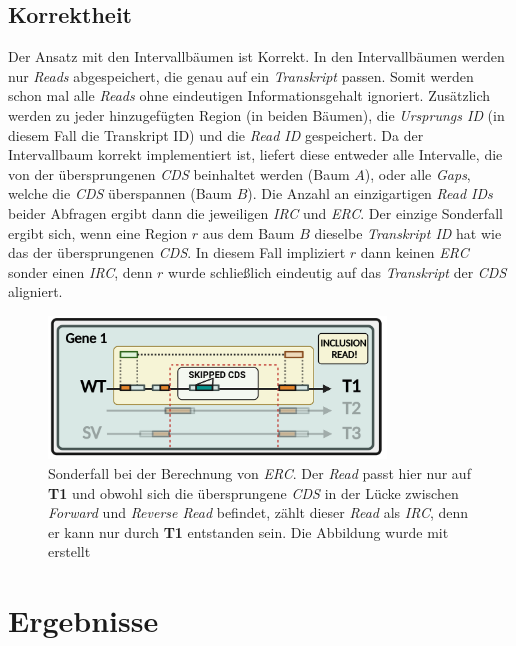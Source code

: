 \documentclass[12pt]{article}
\begin{document}
\subsection{Korrektheit}\label{sec:Korrektheit}
Der Ansatz mit den Intervallbäumen ist Korrekt. In den Intervallbäumen werden nur \textit{Reads} abgespeichert, die genau auf
ein \textit{Transkript} passen. Somit werden schon mal alle \textit{Reads} ohne eindeutigen Informationsgehalt 
ignoriert. Zusätzlich werden zu jeder hinzugefügten Region (in beiden Bäumen), die \textit{Ursprungs ID}
(in diesem Fall die Transkript ID) und die \textit{Read ID} gespeichert. 
Da der Intervallbaum korrekt implementiert ist, liefert diese entweder alle 
Intervalle, die von der übersprungenen \textit{CDS} beinhaltet werden (Baum $A$),
oder alle \textit{Gaps}, welche die \textit{CDS} überspannen (Baum $B$).
Die Anzahl an einzigartigen \textit{Read IDs} beider Abfragen ergibt dann die 
jeweiligen \textit{IRC} und \textit{ERC}.
Der einzige Sonderfall ergibt sich, wenn eine Region $r$ aus dem Baum $B$ dieselbe
\textit{Transkript ID} hat wie das der übersprungenen \textit{CDS}. 
In diesem Fall impliziert $r$ dann keinen \textit{ERC} sonder einen \textit{IRC}, 
denn $r$ wurde schlie\ss lich eindeutig auf das \textit{Transkript} der \textit{CDS}
aligniert.
\begin{figure}[htpb]
    \centering
    \includegraphics[width=0.8\textwidth]{./figures/EdgeCase.png}
    \caption{Sonderfall bei der Berechnung von \textit{ERC}. Der \textit{Read} passt hier nur auf \textbf{T1} und obwohl sich die übersprungene \textit{CDS} in der Lücke zwischen
    \textit{Forward} und \textit{Reverse Read} befindet, zählt dieser \textit{Read} als \textit{IRC}, denn er kann nur durch \textbf{T1} entstanden sein.
Die Abbildung wurde mit \cite{biorender} erstellt}
    \label{fig:-figures-EdgeCase-png}
\end{figure}
\newpage
\section{Ergebnisse}\label{sec:Ergebnisse}
\end{document}
